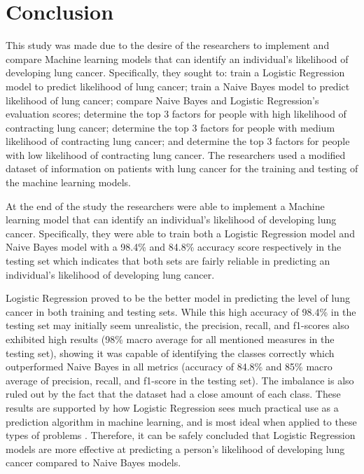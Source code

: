 \documentclass[runningheads]{llncs}
\begin{document}
\section{Conclusion}

This study was made due to the desire of the researchers to implement and compare Machine learning models that can identify an individual’s likelihood of developing lung cancer. Specifically, they sought to: train a Logistic Regression model to predict likelihood of lung cancer; train a Naive Bayes model to predict likelihood of lung cancer; compare Naive Bayes and Logistic Regression’s evaluation scores; determine the top 3 factors for people with high likelihood of contracting lung cancer; determine the top 3 factors for people with medium likelihood of contracting lung cancer; and determine the top 3 factors for people with low likelihood of contracting lung cancer. The researchers used a modified dataset of information on patients with lung cancer for the training and testing of the machine learning models. 

At the end of the study the researchers were able to implement a Machine learning model that can identify an individual’s likelihood of developing lung cancer. Specifically, they were able to train both a Logistic Regression model and Naive Bayes model with a 98.4\% and 84.8\% accuracy score respectively in the testing set which indicates that both sets are fairly reliable in predicting an individual’s likelihood of developing lung cancer. 
	
Logistic Regression proved to be the better model in predicting the level of lung cancer in both training and testing sets. While this high accuracy of 98.4\% in the testing set may initially seem unrealistic, the precision, recall, and f1-scores also exhibited high results (98\% macro average for all mentioned measures in the testing set), showing it was capable of identifying the classes correctly which outperformed Naive Bayes in all metrics (accuracy of 84.8\% and 85\% macro average of precision, recall, and f1-score in the testing set). The imbalance is also ruled out by the fact that the dataset had a close amount of each class. These results are supported by how Logistic Regression sees much practical use as a prediction algorithm in machine learning, and is most ideal when applied to these types of problems \cite{cai2006prediction}. Therefore, it can be safely concluded that Logistic Regression models are more effective at predicting a person’s likelihood of developing lung cancer compared to Naive Bayes models.
\end{document}
